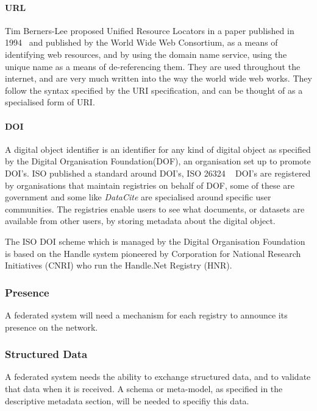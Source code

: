 \documentclass{article}
\begin{document}
	    \paragraph{URL}
		Tim Berners-Lee proposed Unified Resource Locators in a paper published in 1994~\cite{url1} and published by the World Wide Web Consortium, as a means of identifying web resources, and by using the domain name service, using the unique name as a means of de-referencing them. They are used throughout the internet, and are very much written into the way the world wide web works. They follow the syntax specified by the URI specification, and can be thought of as a specialised form of URI.
		
			
		\paragraph{DOI}

		A digital object identifier is an identifier for any kind of digital object as specified by the Digital Organisation Foundation(DOF), an organisation set up to promote DOI's. ISO published a standard around DOI's, ISO 26324 ~\cite{doi1} DOI's are registered by organisations that maintain registries on behalf of DOF, some of these are government and some like \emph{DataCite} are specialised around specific user communities. The registries enable users to see what documents, or datasets are available from other users, by storing metadata about the digital object. 
		
		The ISO DOI scheme which is managed by the Digital Organisation Foundation is based on the Handle system pioneered by Corporation for National Research Initiatives (CNRI) who run the Handle.Net Registry (HNR).
		
		
		\subsubsection{Presence}
		A federated system will need a mechanism for each registry to announce its presence on the network.
		
		\subsubsection{Structured Data}
		A federated system needs the ability to exchange structured data, and to validate that data when it is received. A schema or meta-model, as specified in the descriptive metadata section, will be needed to specifiy this data.
		
\end{document}
